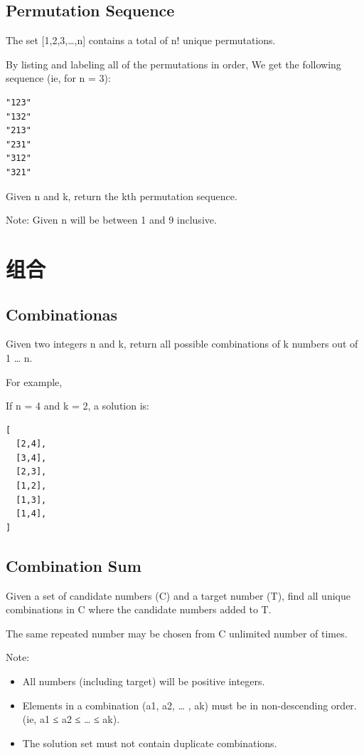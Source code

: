 \documentclass[12pt]{book}
\begin{document}
\subsection{Permutation Sequence}
\label{sec-16-1-3}
The set [1,2,3,…,n] contains a total of n! unique permutations.

By listing and labeling all of the permutations in order, We get the following sequence (ie, for n = 3):
\lstset{language=java,label= ,caption= ,numbers=none}
\begin{lstlisting}
"123"
"132"
"213"
"231"
"312"
"321"
\end{lstlisting}
Given n and k, return the kth permutation sequence.

Note: Given n will be between 1 and 9 inclusive.
\section{组合}
\label{sec-16-2}
\subsection{Combinationas}
\label{sec-16-2-1}
Given two integers n and k, return all possible combinations of k numbers out of 1 \ldots{} n.

For example,

If n = 4 and k = 2, a solution is:
\lstset{language=java,label= ,caption= ,numbers=none}
\begin{lstlisting}
[
  [2,4],
  [3,4],
  [2,3],
  [1,2],
  [1,3],
  [1,4],
]
\end{lstlisting}
\subsection{Combination Sum}
\label{sec-16-2-2}
Given a set of candidate numbers (C) and a target number (T), find all unique combinations in C where the candidate numbers added to T.

The same repeated number may be chosen from C unlimited number of times.

Note:
\begin{itemize}
\item All numbers (including target) will be positive integers.
\item Elements in a combination (a1, a2, … , ak) must be in non-descending order. (ie, a1 ≤ a2 ≤ … ≤ ak).
\item The solution set must not contain duplicate combinations.
\end{itemize}
\end{document}
